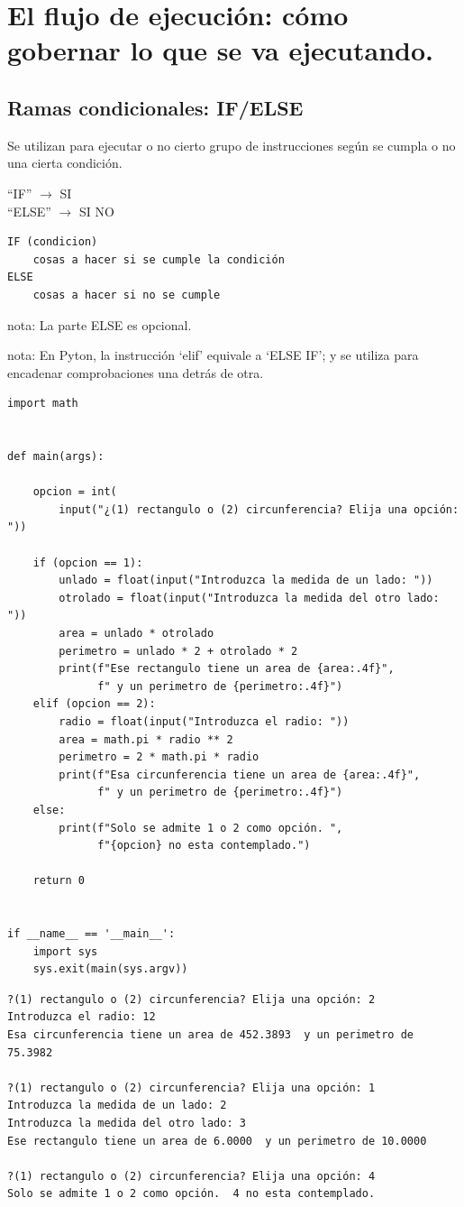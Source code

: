 \documentclass[spanish,12pt,a4paper,final,oneside]{book}
\begin{document}
\chapter{El flujo de ejecución: cómo gobernar lo que se va ejecutando.}

\section{Ramas condicionales: IF/ELSE}
Se utilizan para ejecutar o no cierto grupo de instrucciones según se cumpla o no una cierta condición.

``IF'' $\rightarrow$ SI
\\``ELSE'' $\rightarrow$ SI NO

\begin{lstlisting}
IF (condicion)
    cosas a hacer si se cumple la condición
ELSE
    cosas a hacer si no se cumple
\end{lstlisting}
nota: La parte ELSE es opcional.

nota: En Pyton, la instrucción `elif' equivale a `ELSE IF'; y se utiliza para encadenar comprobaciones una detrás de otra.
\begin{lstlisting}[frame=single, caption=lenguaje python]
import math


def main(args):

    opcion = int(
        input("¿(1) rectangulo o (2) circunferencia? Elija una opción: "))

    if (opcion == 1):
        unlado = float(input("Introduzca la medida de un lado: "))
        otrolado = float(input("Introduzca la medida del otro lado: "))
        area = unlado * otrolado
        perimetro = unlado * 2 + otrolado * 2
        print(f"Ese rectangulo tiene un area de {area:.4f}",
              f" y un perimetro de {perimetro:.4f}")
    elif (opcion == 2):
        radio = float(input("Introduzca el radio: "))
        area = math.pi * radio ** 2
        perimetro = 2 * math.pi * radio
        print(f"Esa circunferencia tiene un area de {area:.4f}",
              f" y un perimetro de {perimetro:.4f}")
    else:
        print(f"Solo se admite 1 o 2 como opción. ",
              f"{opcion} no esta contemplado.")

    return 0


if __name__ == '__main__':
    import sys
    sys.exit(main(sys.argv))
\end{lstlisting}
\begin{lstlisting}[frame=single]
?(1) rectangulo o (2) circunferencia? Elija una opción: 2
Introduzca el radio: 12
Esa circunferencia tiene un area de 452.3893  y un perimetro de 75.3982

?(1) rectangulo o (2) circunferencia? Elija una opción: 1
Introduzca la medida de un lado: 2
Introduzca la medida del otro lado: 3
Ese rectangulo tiene un area de 6.0000  y un perimetro de 10.0000

?(1) rectangulo o (2) circunferencia? Elija una opción: 4
Solo se admite 1 o 2 como opción.  4 no esta contemplado.
\end{lstlisting}
\end{document}
